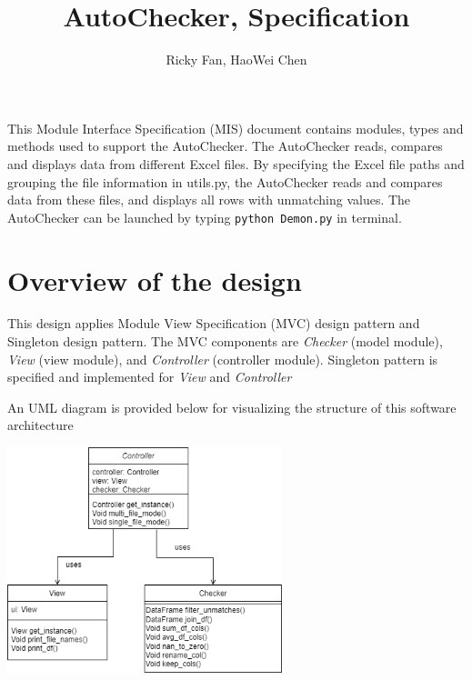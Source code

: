 \documentclass[12pt]{article}
\title{AutoChecker, Specification}
\author{Ricky Fan, HaoWei Chen}
\begin{document}
\maketitle
\noindent This Module Interface Specification (MIS) document contains modules, types and
methods used to support the AutoChecker. The AutoChecker reads, compares and displays 
data from different Excel files. By specifying the Excel file paths and grouping the 
file information in utils.py, the AutoChecker reads and compares data from these files, 
and displays all rows with unmatching values. The AutoChecker can be launched 
by typing \texttt{python Demon.py} in terminal.


\newpage

\section{Overview of the design}

This design applies Module View Specification (MVC) design pattern and 
Singleton design pattern. The MVC components are \textit{Checker} (model module), 
\textit{View} (view module), and \textit{Controller} (controller module). Singleton pattern is 
specified and implemented for \textit{View} and \textit{Controller} 

\bigskip

\noindent An UML diagram is provided below for visualizing the structure of this software architecture

\begin{center}
  \includegraphics[width=0.6\textwidth]{UML_AutoChecker(new).png}
\end{center}
\end{document}
